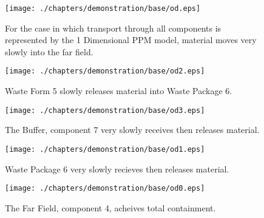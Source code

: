 
\begin{figure}[ht]
\centering
\texttt{[image: ./chapters/demonstration/base/od.eps]}
\caption[One Dimensional PPM Model.]{
For the case in which transport through all components is represented by the 1 
Dimensional PPM model, material moves very slowly into the far field. 
}
\label{fig:odall}
\begin{minipage}[b]{0.45\linewidth}

  \texttt{[image: ./chapters/demonstration/base/od2.eps]}
  \caption[Case ODI Waste Form Contaminants.]{
    Waste Form 5 slowly releases material into Waste Package 6.
    }
  \label{fig:drIVwf5}
  \texttt{[image: ./chapters/demonstration/base/od3.eps]}
  \caption[Case ODI Buffer Contaminants]{
    The Buffer, component 7 very slowly receives then releases material.
    }
  \label{fig:drIVbuff}
\end{minipage}
\hspace{0.05\linewidth}
\begin{minipage}[b]{0.45\linewidth}
  \texttt{[image: ./chapters/demonstration/base/od1.eps]}
  \caption[Case ODI Waste Package Contaminants.]{ 
    Waste Package 6 very slowly recieves then releases material. 
    }
  \label{fig:drIVwp6}
  \texttt{[image: ./chapters/demonstration/base/od0.eps]}
  \caption[Case ODI Waste Package Contaminants.]{ 
    The Far Field, component 4, acheives total containment.
    }
  \label{fig:drIVff0}


  \end{minipage}
\end{figure}
